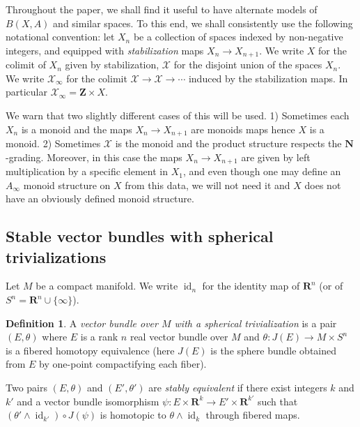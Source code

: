 \documentclass[reqno]{amsart}
\newcommand{\THOMAS}[1]%
	{\begin{quotation}{\footnotesize\textcolor{brown}{\textbf{Thomas:} #1}}\end{quotation}}
\theoremstyle{theorem}
\theoremstyle{remark}
\theoremstyle{definition}
\newtheorem{definition}[corollary]{Definition}
\newcommand{\R}{\mathbf{R}}
\newcommand{\Z}{\mathbf{Z}}
\newcommand{\N}{\mathbf{N}}
\DeclareMathOperator{\id}{id}
\begin{document}


Throughout the paper, we shall find it useful to have alternate models of $ B(X,A) $ and similar spaces. To this end, we shall consistently use the following notational convention: let $X_n$ be a collection of spaces indexed by non-negative integers, and equipped with \emph{stabilization} maps $X_n \to X_{n+1}$. We write $X$ for the colimit of $X_n$ given by stabilization, $\mathcal{X}$ for the disjoint union of the spaces $X_n$. We write $\mathcal{X}_\infty$ for the colimit $\mathcal{X}\to \mathcal{X} \to \cdots$ induced by the stabilization maps. In particular $\mathcal{X}_\infty = \Z \times X$.


We warn that two slightly different cases of this will be used. 1) Sometimes each $X_n$ is a monoid and the maps $X_n \to X_{n+1}$ are monoids maps hence $X$ is a monoid. 2) Sometimes $\mathcal{X}$ is the monoid and the product structure respects the $\N$-grading. Moreover, in this case the maps $X_n \to X_{n+1}$ are given by left multiplication by a specific element in $X_1$, and even though one may define an $A_\infty$ monoid structure on $X$ from this data, we will not need it and $X$ does not have an obviously defined monoid structure.




\subsection{Stable vector bundles with spherical trivializations}
Let $M$ be a compact manifold. We write $\id_n$ for the identity map of $\R^n$ (or of $S^n=\R^n\cup\{\infty\}$).


\begin{definition}
A \emph{vector bundle over $M$ with a spherical trivialization} is a pair $(E,\theta)$
where $E$ is a rank $n$ real vector bundle over $M$ and $\theta : J(E) \to M\times S^n$
is a fibered homotopy equivalence (here $J(E)$ is the sphere bundle obtained from $E$
by one-point compactifying each fiber).




Two pairs $(E,\theta)$ and $(E',\theta')$ are \emph{stably equivalent} if
there exist integers $k$ and $k'$ and a vector bundle isomorphism $\psi:E\times \R^k \to E'\times \R^{k'}$
such that $(\theta'\wedge\id_{k'})\circ J(\psi)$ is homotopic to $\theta\wedge \id_k$ through fibered maps.
\end{definition}
\end{document}
